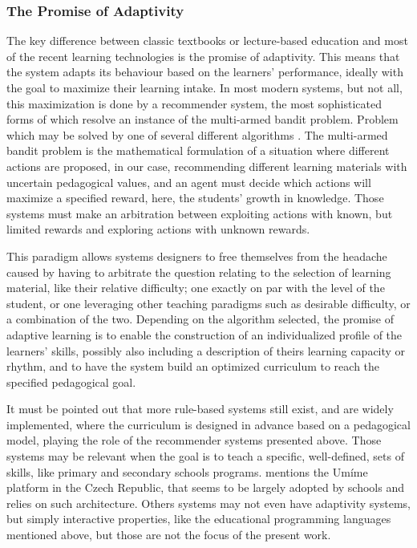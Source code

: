         \subsubsection{The Promise of Adaptivity}
The key difference between classic textbooks or lecture-based education and most of the recent learning technologies is the promise of adaptivity. This means that the system adapts its behaviour based on the learners' performance, ideally with the goal to maximize their learning intake. In most modern systems, but not all, this maximization is done by a recommender system, the most sophisticated forms of which resolve an instance of the multi-armed bandit problem. Problem which may be solved by one of several different algorithms \parencite{chen_recommendation_2017}. The multi-armed bandit problem is the mathematical formulation of a situation where different actions are proposed, in our case, recommending different learning materials with uncertain pedagogical values, and an agent must decide which actions will maximize a specified reward, here, the students' growth in knowledge. Those systems must make an arbitration between exploiting actions with known, but limited rewards and exploring actions with unknown rewards.

This paradigm allows systems designers to free themselves from the headache caused by having to arbitrate the question relating to the selection of learning material, like their relative difficulty; one exactly on par with the level of the student, or one leveraging other teaching paradigms such as desirable difficulty, or a combination of the two. Depending on the algorithm selected, the promise of adaptive learning is to enable the construction of an individualized profile of the learners' skills, possibly also including a description of theirs learning capacity or rhythm, and to have the system build an optimized curriculum to reach the specified pedagogical goal.

It must  be pointed out that more rule-based systems still exist, and are widely implemented, where the curriculum is designed in advance based on a pedagogical model, playing the role of the recommender systems presented above. Those systems may be relevant when the goal is to teach a specific, well-defined, sets of skills, like primary and secondary schools programs. \textcite{pelanek_adaptive_2025} mentions the Umíme platform in the Czech Republic, that seems to be largely adopted by schools and relies on such architecture. Others systems may not even have adaptivity systems, but simply interactive properties, like the educational programming languages mentioned above, but those are not the focus of the present work.

